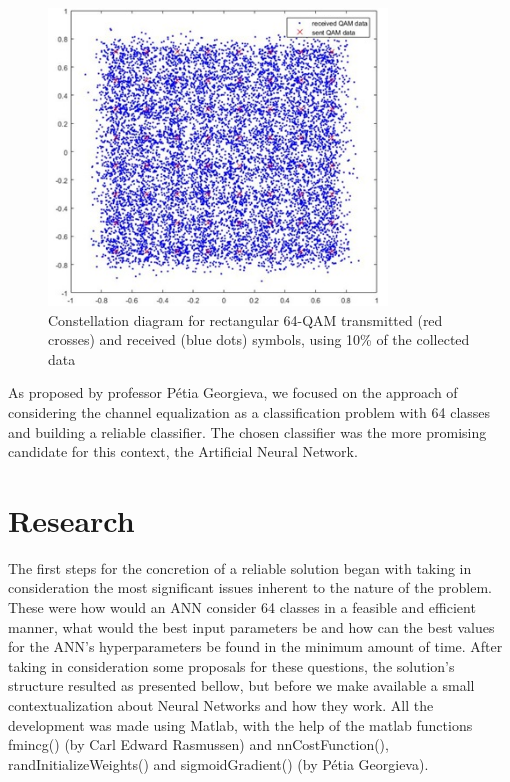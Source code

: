 \documentclass[10pt]{IEEEtran}
\begin{document}
\begin{figure}[H]
\centering
\includegraphics[width=9cm]{figure2.jpg}
\caption{Constellation diagram for rectangular 64-QAM transmitted (red crosses) and received (blue dots) symbols, using 10\% of the collected data}
\end{figure}

As proposed by professor Pétia Georgieva, we focused on the approach of considering the channel equalization as a classification problem with 64 classes and building a reliable classifier. The chosen classifier was the more promising candidate for this context, the Artificial Neural Network.

\section{Research} %

The first steps for the concretion of a reliable solution began with taking in consideration the most significant issues inherent to the nature of the problem. These were how would an ANN consider 64 classes in a feasible and efficient manner, what would the best input parameters be and how can the best values for the ANN's hyperparameters be found in the minimum amount of time. After taking in consideration some proposals for these questions, the solution's structure resulted as presented bellow, but before we make available a small contextualization about Neural Networks and how they work.
All the development was made using Matlab, with the help of the matlab functions fmincg() (by Carl Edward Rasmussen) and nnCostFunction(), randInitializeWeights() and sigmoidGradient() (by Pétia Georgieva).
\end{document}
